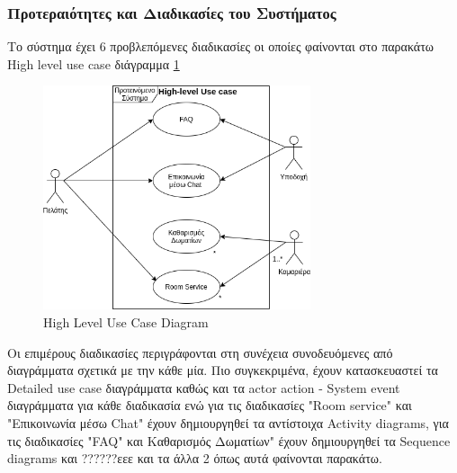 \subsubsection{Προτεραιότητες και Διαδικασίες του Συστήματος}
Το σύστημα έχει 6 προβλεπόμενες διαδικασίες οι οποίες φαίνονται στο παρακάτω High level use case 
διάγραμμα \ref{high_level_use_case}  
\begin{figure}[H]
	\centering
	\includegraphics[width=0.7\textwidth]{Images/High_level_use_case}
	\caption{High Level Use Case Diagram}
	\label{high_level_use_case}
\end{figure}

\noindent
Οι επιμέρους διαδικασίες περιγράφονται στη συνέχεια συνοδευόμενες από διαγράμματα σχετικά 
με την κάθε μία. Πιο συγκεκριμένα, έχουν κατασκευαστεί τα Detailed use case διαγράμματα  καθώς 
και τα actor action - System event διαγράμματα για κάθε διαδικασία ενώ για τις διαδικασίες "Room 
service" και "Επικοινωνία μέσω  Chat" έχουν δημιουργηθεί  τα αντίστοιχα Activity diagrams, για τις 
διαδικασίες  "FAQ" και  Καθαρισμός Δωματίων" έχουν δημιουργηθεί  τα Sequence diagrams και 
??????εεε και τα άλλα 2 όπως αυτά φαίνονται παρακάτω.\\

